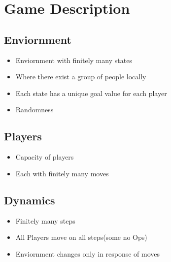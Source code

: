 \documentclass{article}
\begin{document}
\section{Game Description}
    
\subsection{Enviornment}
\begin{itemize}
	\item Enviornment with finitely many states
	\item Where there exist a group of people locally  
	\item Each state has a unique goal value for each player
	\item Randomness 	
\end{itemize}
\subsection{Players}
\begin{itemize}
	\item Capacity of players
	\item Each with finitely many moves
\end{itemize}
\subsection{Dynamics}
\begin{itemize}
	\item Finitely many steps
	\item All Players move on all steps(some no Ops)
	\item Enviornment changes only in response of moves

\end{itemize}
            
\end{document}
